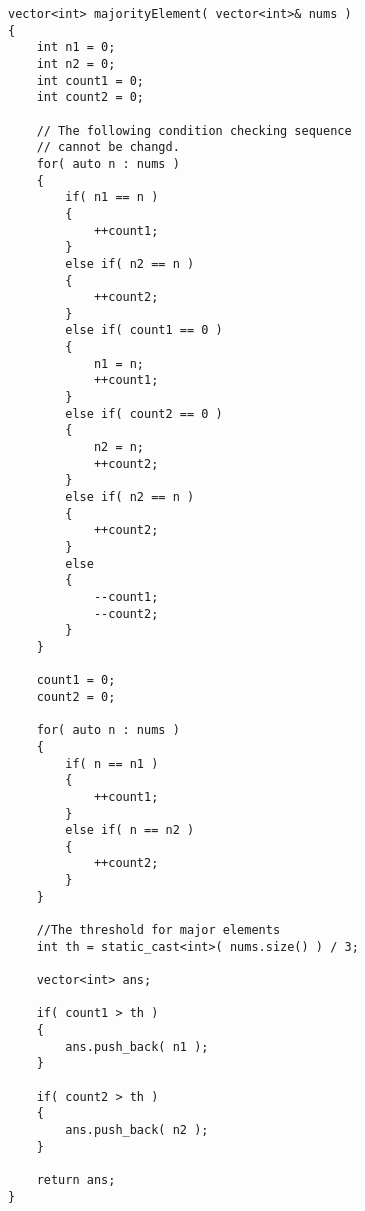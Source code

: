 \setcounter{lstlisting}{0}
\begin{lstlisting}[style=customc, caption={Two Candidates Voting Algorithm}]
vector<int> majorityElement( vector<int>& nums )
{
    int n1 = 0;
    int n2 = 0;
    int count1 = 0;
    int count2 = 0;

    // The following condition checking sequence
    // cannot be changd.
    for( auto n : nums )
    {
        if( n1 == n )
        {
            ++count1;
        }
        else if( n2 == n )
        {
            ++count2;
        }
        else if( count1 == 0 )
        {
            n1 = n;
            ++count1;
        }
        else if( count2 == 0 )
        {
            n2 = n;
            ++count2;
        }
        else if( n2 == n )
        {
            ++count2;
        }
        else
        {
            --count1;
            --count2;
        }
    }

    count1 = 0;
    count2 = 0;

    for( auto n : nums )
    {
        if( n == n1 )
        {
            ++count1;
        }
        else if( n == n2 )
        {
            ++count2;
        }
    }

    //The threshold for major elements
    int th = static_cast<int>( nums.size() ) / 3;

    vector<int> ans;

    if( count1 > th )
    {
        ans.push_back( n1 );
    }

    if( count2 > th )
    {
        ans.push_back( n2 );
    }

    return ans;
}
\end{lstlisting}